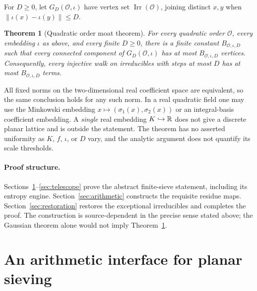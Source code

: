 \documentclass[11pt]{article}
\numberwithin{equation}{section}
\newtheorem{theorem}{Theorem}[section]
\theoremstyle{definition}\newtheorem{definition}[theorem]{Definition}
\theoremstyle{remark}\newtheorem{remark}[theorem]{Remark}
\newcommand{\OO}{\mathcal O}\newcommand{\PP}{\mathcal P}
\newcommand{\norm}[1]{\lVert #1\rVert}
\newcommand{\Irr}{\operatorname{Irr}}
\begin{document}
For $D\ge0$, let $G_D(\OO,\iota)$ have vertex set $\Irr(\OO)$, joining distinct $x,y$ when $\norm{\iota(x)-\iota(y)}\le D$.

\begin{theorem}[Quadratic order moat theorem]\label{thm:main}
For every quadratic order $\OO$, every embedding $\iota$ as above, and every finite $D\ge0$, there is a finite constant $B_{\OO,\iota,D}$ such that every connected component of $G_D(\OO,\iota)$ has at most $B_{\OO,\iota,D}$ vertices. Consequently, every injective walk on irreducibles with steps at most $D$ has at most $B_{\OO,\iota,D}$ terms.
\end{theorem}

All fixed norms on the two-dimensional real coefficient space are equivalent, so the same conclusion holds for any such norm. In a real quadratic field one may use the Minkowski embedding $x\mapsto(\sigma_1(x),\sigma_2(x))$ or an integral-basis coefficient embedding. A \emph{single} real embedding $K\hookrightarrow\mathbb R$ does not give a discrete planar lattice and is outside the statement. The theorem has no asserted uniformity as $K$, $f$, $\iota$, or $D$ vary, and the analytic argument does not quantify its scale thresholds.

\paragraph{Proof structure.}
Sections~\ref{sec:interface}--\ref{sec:telescope} prove the abstract finite-sieve statement, including its entropy engine. Section~\ref{sec:arithmetic} constructs the requisite residue maps. Section~\ref{sec:restoration} restores the exceptional irreducibles and completes the proof. The construction is source-dependent in the precise sense stated above; the Gaussian theorem alone would not imply Theorem~\ref{thm:main}.

\section{An arithmetic interface for planar sieving}\label{sec:interface}
\end{document}
